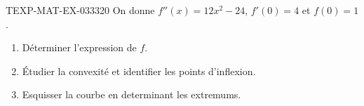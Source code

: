 \begin{exercice}{TEXP-MAT-EX-033}{3}{20}
On donne $f''(x) = 12x^2 - 24$, $f'(0) = 4$ et $f(0) = 1$.
\begin{enumerate}
  \item Déterminer l'expression de $f$.
  \item Étudier la convexité et identifier les points d'inflexion.
  \item Esquisser la courbe en determinant les extremums.
\end{enumerate}

\end{exercice}
